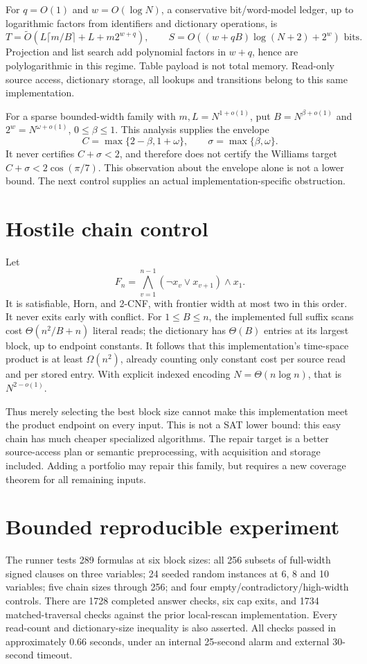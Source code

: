 \documentclass[11pt]{article}
\begin{document}
For $q=O(1)$ and $w=O(\log N)$, a conservative bit/word-model ledger, up to logarithmic factors from identifiers and dictionary operations, is
\[
T=\widetilde O\left(L\lceil m/B\rceil+L+m2^{w+q}\right),
\qquad
S=O\left((w+qB)\log(N+2)+2^w\right)\text{ bits}.
\]
Projection and list search add polynomial factors in $w+q$, hence are polylogarithmic in this regime. Table payload is not total memory. Read-only source access, dictionary storage, all lookups and transitions belong to this same implementation.

For a sparse bounded-width family with $m,L=N^{1+o(1)}$, put $B=N^{\beta+o(1)}$ and $2^w=N^{\omega+o(1)}$, $0\le\beta\le1$. This analysis supplies the envelope
\[
C=\max\{2-\beta,1+\omega\},\qquad
\sigma=\max\{\beta,\omega\}.
\]
It never certifies $C+\sigma<2$, and therefore does not certify the Williams target $C+\sigma<2\cos(\pi/7)$. This observation about the envelope alone is not a lower bound. The next control supplies an actual implementation-specific obstruction.

\section{Hostile chain control}
Let
\[
F_n=\bigwedge_{v=1}^{n-1}(\neg x_v\lor x_{v+1})\land x_1.
\]
It is satisfiable, Horn, and 2-CNF, with frontier width at most two in this order. It never exits early with conflict. For $1\le B\le n$, the implemented full suffix scans cost $\Theta(n^2/B+n)$ literal reads; the dictionary has $\Theta(B)$ entries at its largest block, up to endpoint constants. It follows that this implementation's time-space product is at least $\Omega(n^2)$, already counting only constant cost per source read and per stored entry. With explicit indexed encoding $N=\Theta(n\log n)$, that is $N^{2-o(1)}$.

Thus merely selecting the best block size cannot make this implementation meet the product endpoint on every input. This is not a SAT lower bound: this easy chain has much cheaper specialized algorithms. The repair target is a better source-access plan or semantic preprocessing, with acquisition and storage included. Adding a portfolio may repair this family, but requires a new coverage theorem for all remaining inputs.

\section{Bounded reproducible experiment}
The runner tests 289 formulas at six block sizes: all 256 subsets of full-width signed clauses on three variables; 24 seeded random instances at 6, 8 and 10 variables; five chain sizes through 256; and four empty/contradictory/high-width controls. There are 1728 completed answer checks, six cap exits, and 1734 matched-traversal checks against the prior local-rescan implementation. Every read-count and dictionary-size inequality is also asserted. All checks passed in approximately 0.66 seconds, under an internal 25-second alarm and external 30-second timeout.
\end{document}
